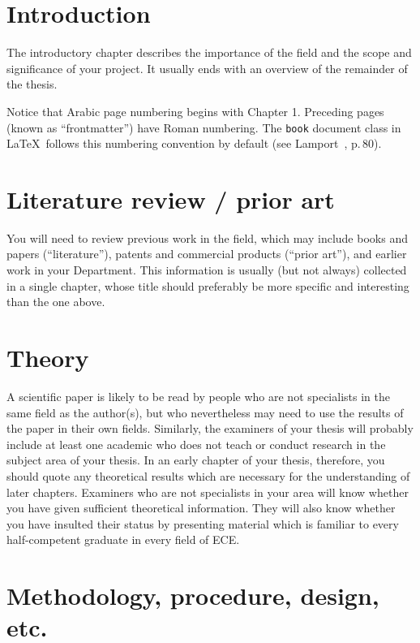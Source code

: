 \documentclass[12pt,openany,a4paper]{book}
\begin{document}
\chapter{Introduction}

The introductory chapter describes the importance of the field and the
scope and significance of your project.  It usually ends with an
overview of the remainder of the thesis.

Notice that Arabic page numbering begins with Chapter 1.  Preceding
pages (known as ``frontmatter'') have Roman numbering.  The
\texttt{book} document class in \LaTeX\ follows this numbering
convention by default (see Lamport~\cite{lamport}, p.\,80).

\chapter{Literature review / prior art}

You will need to review previous work in the field, which may include
books and papers (``literature''), patents and commercial products
(``prior art''), and earlier work in your Department.  This
information is usually (but not always) collected in a single chapter,
whose title should preferably be more specific and interesting than
the one above.

\chapter{Theory}

A scientific paper is likely to be read by people who are not
specialists in the same field as the author(s), but who nevertheless
may need to use the results of the paper in their own fields.
Similarly, the examiners of your thesis will probably include at least
one academic who does not teach or conduct research in the subject
area of your thesis.  In an early chapter of your thesis, therefore,
you should quote any theoretical results which are necessary for the
understanding of later chapters.  Examiners who are not specialists in
your area will know whether you have given sufficient theoretical
information.  They will also know whether you have insulted their
status by presenting material which is familiar to every
half-competent graduate in every field of ECE.

\chapter{Methodology, procedure, design, etc.}
\end{document}
